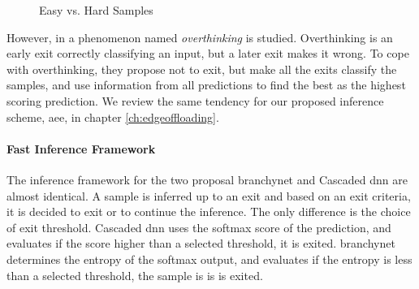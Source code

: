 \begin{figure}
	\captionsetup[subfigure]{justification=centering}
	\centering
	\caption[Easy vs. Hard Samples]{Easy vs. Hard Samples}
	\label{fig:hardvseasydog}
\end{figure}

However, in \cite{kaya_shallow-deep_nodate}  a phenomenon named \emph{overthinking} is studied. Overthinking is an early exit correctly classifying an input, but a later exit makes it wrong. To cope with overthinking, they propose not to exit, but make all the exits classify the samples, and use information from all predictions to find the best as the highest scoring prediction. We review the same tendency for our proposed inference scheme, \gls{aee}, in chapter \ref{ch:edgeoffloading}.

\paragraph{Fast Inference Framework} The inference framework for the two proposal \gls{branchynet} and Cascaded \gls{dnn} are almost identical. A sample is inferred up to an exit and based on an exit criteria, it is decided to exit or to continue the inference. The only difference is the choice of exit threshold. Cascaded \gls{dnn} uses the softmax score of the prediction, and evaluates if the score higher than a selected threshold, it is exited. \gls{branchynet} determines the entropy of the softmax output, and evaluates if the entropy is less than a selected threshold, the sample is is is exited.

